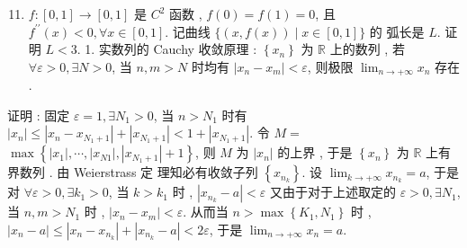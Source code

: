 \documentclass[10pt]{article}
\begin{document}
\begin{enumerate}
  \setcounter{enumi}{10}
  \item $f:[0,1] \rightarrow[0,1]$  是  $C^{2}$  函数 , $f(0)=f(1)=0$,  且  $f^{\prime \prime}(x)<0, \forall x \in[0,1]$.  记曲线  $\{(x, f(x)) \mid x \in[0,1]\}$  的   弧长是  $L$.  证明  $L<3$. 1.  实数列的  Cauchy  收敛原理 : $\left\{x_{n}\right\}$  为  $\mathbb{R}$  上的数列 ,  若  $\forall \varepsilon>0, \exists N>0$,  当  $n, m>N$  时均有  $\left|x_{n}-x_{m}\right|<\varepsilon$,  则极限  $\lim _{n \rightarrow+\infty} x_{n}$  存在 .
\end{enumerate}
 证明 :  固定  $\varepsilon=1, \exists N_{1}>0$,  当  $n>N_{1}$  时有  $\left|x_{n}\right| \leq\left|x_{n}-x_{N_{1}+1}\right|+\left|x_{N_{1}+1}\right|<1+\left|x_{N_{1}+1}\right|$.  令  $M=$ $\max \left\{\left|x_{1}\right|, \cdots,\left|x_{N 1}\right|,\left|x_{N_{1}+1}\right|+1\right\}$,  则  $M$  为  $\left|x_{n}\right|$  的上界 ,  于是  $\left\{x_{n}\right\}$  为  $\mathbb{R}$  上有界数列 .  由  Weierstrass  定   理知必有收敛子列  $\left\{x_{n_{k}}\right\}$.  设  $\lim _{k \rightarrow+\infty} x_{n_{k}}=a$,  于是对  $\forall \varepsilon>0, \exists k_{1}>0$,  当  $k>k_{1}$  时 , $\left|x_{n_{k}}-a\right|<\varepsilon$  又由于对于上述取定的  $\varepsilon>0, \exists N_{1}$,  当  $n, m>N_{1}$  时 , $\left|x_{n}-x_{m}\right|<\varepsilon$.  从而当  $n>\max \left\{K_{1}, N_{1}\right\}$  时 , $\left|x_{n}-a\right| \leq\left|x_{n}-x_{n_{k}}\right|+\left|x_{n_{k}}-a\right|<2 \varepsilon$,  于是  $\lim _{n \rightarrow+\infty} x_{n}=a$.
\end{document}
